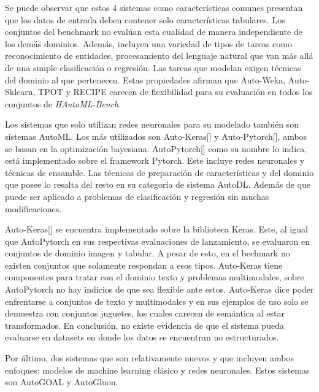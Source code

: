 Se puede observar que estos 4 sistemas como características comunes presentan que los datos de entrada deben contener solo características tabulares.
Los conjuntos del benchmark no evalúan esta cualidad de manera independiente de los demás dominios. Además, incluyen una variedad de tipos de tareas como 
reconocimiento de entidades, procesamiento del lenguaje natural que van más allá de una simple clasificación o regresión. Las tareas que modelan 
exigen técnicas del dominio al que pertenecen. Estas propiedades afirman que Auto-Weka, Auto-Sklearn, TPOT y RECIPE carecen de flexibilidad para 
su evaluación en todos los conjuntos de \textit{HAutoML-Bench}.

Los sistemas que solo utilizan redes neuronales para su modelado también son sistemas AutoML. Los más utilizados son Auto-Keras[\cite{13}] y Auto-Pytorch[\cite{21}], 
ambos se basan en la optimización bayesiana. 
AutoPytorch[\cite{21}] como su nombre lo indica, está implementado sobre el framework Pytorch. Este incluye redes neuronales y técnicas de ensamble. 
Las técnicas de preparación de características y del dominio que posee lo resalta del resto en su categoría de sistema AutoDL. Además de que puede ser aplicado a 
problemas de clasificación y regresión sin muchas modificaciones.

Auto-Keras[\cite{13}] se encuentra implementado sobre la biblioteca Keras. Este, al igual que AutoPytorch en sus respectivas evaluaciones de lanzamiento, 
se evaluaron en conjuntos de dominio imagen y tabular. A pesar de esto, en el bechmark no existen conjuntos que solamente respondan a esos tipos. 
Auto-Keras tiene componentes para tratar con el dominio texto y problemas multimodales, sobre AutoPytorch no hay indicios de que sea flexible 
ante estos. 
Auto-Keras dice poder enfrentarse a conjuntos de texto y multimodales y en sus ejemplos de uso solo se demuestra con conjuntos juguetes, los cuales carecen de 
semántica al estar transformados. En conclusión, no existe evidencia de que el sistema pueda evaluarse en datasets en donde los datos se encuentran no estructurados. 

Por último, dos sistemas que son relativamente nuevos y que incluyen ambos enfoques: modelos de machine learning clásico y redes neuronales. 
Estos sistemas son AutoGOAL y AutoGluon.

